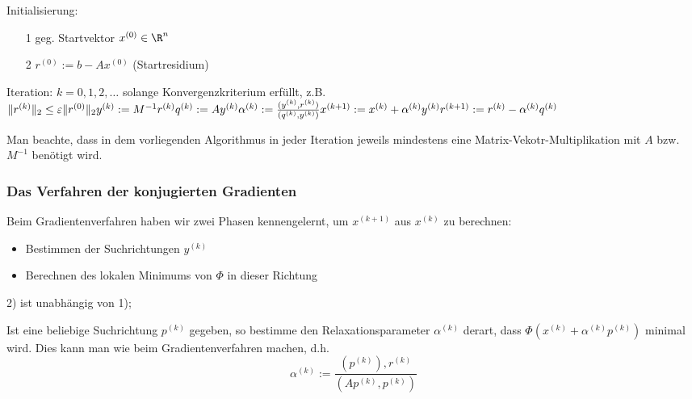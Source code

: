 \begin{algorithmus}
  Initialisierung: 
  \begin{itemize}
    \item[1] geg. Startvektor $x^{(0)} \in \R^n$
    \item[2] $r^{(0)}:= b-Ax^{(0)}$ (Startresidium)
  \end{itemize}
  Iteration: $k=0,1,2,\dots$ solange Konvergenzkriterium erfüllt, z.B. 
  $\|r^{(k)}\|_2 \leq \varepsilon \|r^{(0)}\|_2\\
  y^{(k)}:=M^{-1}r^{(k)}\\
  q^{(k)}:=Ay^{(k)}\\
  \alpha^{(k)}:=\frac{(y^{(k)},r^{(k)})}{(q^{(k)},y^{(k)})}\\
  x^{(k+1)}:=x^{(k)}+\alpha^{(k)}y^{(k)}\\
  r^{(k+1)}:=r^{(k)}-\alpha^{(k)}q^{(k)}$
\end{algorithmus}

\begin{bemerkung}
  Man beachte, dass in dem vorliegenden Algorithmus in jeder Iteration jeweils mindestens eine Matrix-Vekotr-Multiplikation mit $A$ bzw. $M^{-1}$ benötigt wird.
\end{bemerkung}

\subsubsection{Das Verfahren der konjugierten Gradienten}
Beim Gradientenverfahren haben wir zwei Phasen kennengelernt, um $x^{(k+1)}$ aus $x^{(k)}$ zu berechnen:
\begin{itemize}
  \item Bestimmen der Suchrichtungen $y^{(k)}$
  \item Berechnen des lokalen Minimums von $\Phi$ in dieser Richtung
\end{itemize}

\begin{bemerkung}[Beobachtung]
  2) ist unabhängig von 1); 
\end{bemerkung}

Ist eine beliebige Suchrichtung $p^{(k)}$ gegeben, so bestimme den Relaxationsparameter $\alpha^{(k)}$ derart, dass $\Phi(x^{(k)}+\alpha^(k)p^{(k)})$ minimal wird. Dies kann man wie beim Gradientenverfahren machen, d.h. 
\begin{equation*}
  \alpha^{(k)} := \frac{(p^(k)),r^{(k)}}{(Ap^{(k)},p^{(k)})}
\end{equation*}

